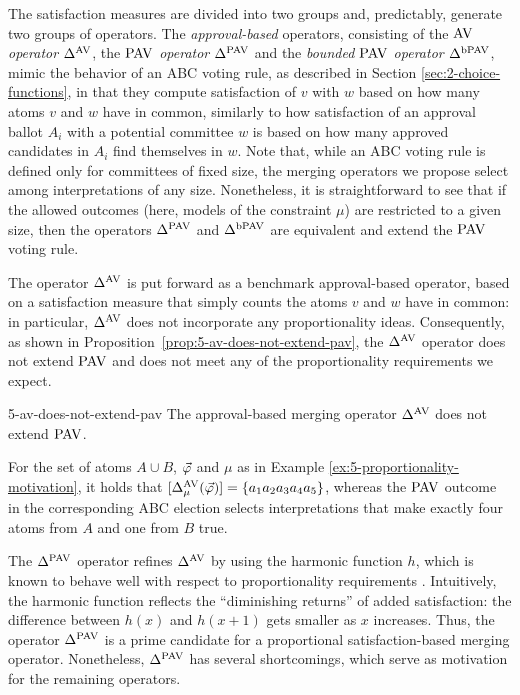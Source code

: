 The satisfaction measures are divided into two groups 
and, predictably, generate two groups of operators.
The \emph{approval-based} operators, consisting of
the \emph{$\av$ operator $\me^{\av}$},
the \emph{$\pav$ operator $\me^{\pav}$}
and the \emph{bounded $\pav$ operator $\me^{\bpav}$},
mimic the behavior of an ABC voting rule, as described in Section \ref{sec:2-choice-functions},
in that they compute satisfaction of $v$ with $w$ based on how many atoms $v$ and $w$ have in common,
similarly to how satisfaction of an approval ballot $A_i$ with a potential committee $w$ 
is based on how many approved candidates in $A_i$ find themselves in $w$.
Note that, while an ABC voting rule is defined only for committees of fixed size,
the merging operators we propose select among interpretations of any size.
Nonetheless, it is straightforward to see that if the allowed outcomes 
(here, models of the constraint $\mu$) 
are restricted to a given size, then the operators $\me^{\pav}$ and $\me^{\bpav}$
are equivalent and extend
the $\pav$ voting rule.

The operator $\me^{\av}$ is put forward 
as a benchmark approval-based operator, based on a satisfaction measure that simply counts 
the atoms $v$ and $w$ have in common:
in particular, $\me^{\av}$ does not incorporate any proportionality ideas.
Consequently, as shown in Proposition~\ref{prop:5-av-does-not-extend-pav},
the $\me^{\av}$ operator 
does not extend $\pav$
and does not meet any of the proportionality requirements we expect.

\begin{prp}{}{5-av-does-not-extend-pav}
	The approval-based merging operator $\me^{\av}$ does not extend $\pav$.
\end{prp}
\begin{prf*}{}{}%
	For the set of atoms $A\cup B$, 
	$\P$ and $\mu$ as in Example \ref{ex:5-proportionality-motivation},
	it holds that $\mods{\me^{\av}_{\mu}(\P)}=\set{a_1a_2a_3a_4a_5}$,
	whereas the $\pav$ outcome in the corresponding ABC election
	selects interpretations that make exactly four atoms from $A$
	and one from $B$ true. 
\end{prf*}
 
The $\me^{\pav}$ operator refines $\me^{\av}$ 
by using the harmonic function $h$,
which is known to behave well with respect 
to proportionality requirements \cite{AzizBCEFW17}.
Intuitively, the harmonic function 
reflects the ``diminishing returns'' of added satisfaction: 
the difference between $h(x)$ and $h(x+1)$ gets smaller as $x$ increases.
Thus, the operator $\me^{\pav}$ is a prime candidate for a proportional satisfaction-based merging operator.
Nonetheless, $\me^{\pav}$ has several shortcomings, which serve as motivation for the remaining operators.

